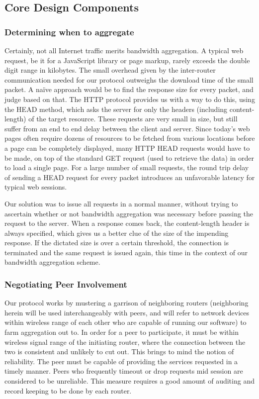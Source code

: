 \documentclass[12pt]{article}
\begin{document}
	\subsection{Core Design Components}

		\subsubsection{Determining when to aggregate}

			Certainly, not all Internet traffic merits bandwidth aggregation. A typical web request, be it for a JavaScript library or page markup, rarely exceeds the double digit range in kilobytes. The small overhead given by the inter-router communication needed for our protocol outweighs the download time of the small packet. A na\"{i}ve approach would be to find the response size for every packet, and judge based on that. The HTTP protocol provides us with a way to do this, using the HEAD method, which asks the server for only the headers (including content-length) of the target resource. These requests are very small in size, but still suffer from an end to end delay between the client and server. Since today's web pages often require dozens of resources to be fetched from various locations before a page can be completely displayed, many HTTP HEAD requests would have to be made, on top of the standard GET request (used to retrieve the data) in order to load a single page. For a large number of small requests, the round trip delay of sending a HEAD request for every packet introduces an unfavorable latency for typical web sessions. 

			Our solution was to issue all requests in a normal manner, without trying to ascertain whether or not bandwidth aggregation was necessary before passing the request to the server. When a response comes back, the content-length header is always specified, which gives us a better clue of the size of the impending response. If the dictated size is over a certain threshold, the connection is terminated and the same request is issued again, this time in the context of our bandwidth aggregation scheme.

		\subsubsection{Negotiating Peer Involvement}

			Our protocol works by mustering a garrison of neighboring routers (neighboring herein will be used interchangeably with peers, and will refer to network devices within wireless range of each other who are capable of running our software) to farm aggregation out to. In order for a peer to participate, it must be within wireless signal range of the initiating router, where the connection between the two is consistent and unlikely to cut out. This brings to mind the notion of reliability. The peer must be capable of providing the services requested in a timely manner. Peers who frequently timeout or drop requests mid session are considered to be unreliable. This measure requires a good amount of auditing and record keeping to be done by each router. 
\end{document}
